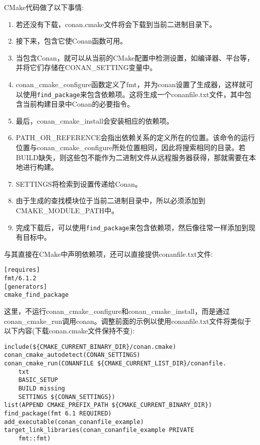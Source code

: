 CMake代码做了以下事情:

\begin{enumerate}
\item 
若还没有下载，conan.cmake文件将会下载到当前二进制目录下。

\item 
接下来，包含它使Conan函数可用。

\item 
当包含Conan，就可以从当前的CMake配置中检测设置，如编译器、平台等，并将它们存储在CONAN\_SETTING变量中。

\item 
conan\_cmake\_configure函数定义了fmt，并为conan设置了生成器，这样就可以使用\texttt{find\_package}来包含依赖项。这将生成一个conanfile.txt文件，其中包含当前构建目录中Conan的必要指令。

\item 
最后，conan\_cmake\_install会安装相应的依赖项。

\item 
PATH\_OR\_REFERENCE会指出依赖关系的定义所在的位置。该命令的运行位置与conan\_cmake\_configure所处位置相同，因此将搜索相同的目录。若BUILD缺失，则这些包不能作为二进制文件从远程服务器获得，那就需要在本地进行构建。

\item 
SETTINGS将检索到设置传递给Conan。

\item 
由于生成的查找模块位于当前二进制目录中，所以必须添加到CMAKE\_MODULE\_PATH中。

\item 
完成下载后，可以使用\texttt{find\_package}来包含依赖项，然后像往常一样添加到现有目标中。
\end{enumerate}

与其直接在CMake中声明依赖项，还可以直接提供conanfile.txt文件:

\begin{lstlisting}[style=styleCMake]
[requires]
fmt/6.1.2
[generators]
cmake_find_package
\end{lstlisting}

这里，不运行conan\_cmake\_configure和conan\_cmake\_install，而是通过conan\_cmake\_run调用conan。调整前面的示例以使用conanfile.txt文件将类似于以下内容(下载conan.cmake文件保持不变):

\begin{lstlisting}[style=styleCMake]
include(${CMAKE_CURRENT_BINARY_DIR}/conan.cmake)
conan_cmake_autodetect(CONAN_SETTINGS)
conan_cmake_run(CONANFILE ${CMAKE_CURRENT_LIST_DIR}/conanfile.
	txt
	BASIC_SETUP
	BUILD missing
	SETTINGS ${CONAN_SETTINGS})
list(APPEND CMAKE_PREFIX_PATH ${CMAKE_CURRENT_BINARY_DIR})
find_package(fmt 6.1 REQUIRED)
add_executable(conan_conanfile_example)
target_link_libraries(conan_conanfile_example PRIVATE
	fmt::fmt)
\end{lstlisting}

